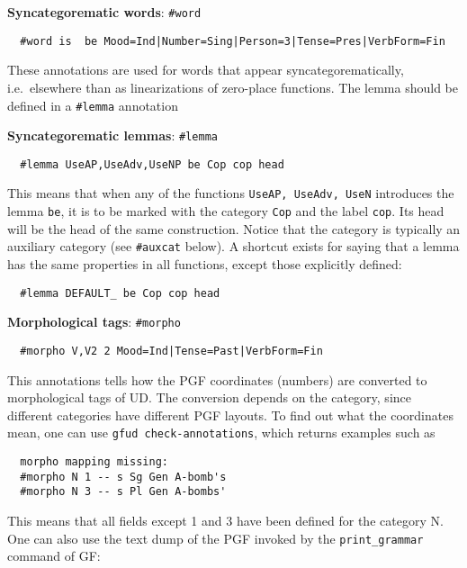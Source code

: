 \textbf{Syncategorematic words}: \texttt{\#word}

\begin{verbatim}
  #word is  be Mood=Ind|Number=Sing|Person=3|Tense=Pres|VerbForm=Fin
\end{verbatim}

These annotations are used for words that appear syncategorematically,
i.e.~elsewhere than as linearizations of zero-place functions. The lemma
should be defined in a \texttt{\#lemma} annotation

\textbf{Syncategorematic lemmas}: \texttt{\#lemma}

\begin{verbatim}
  #lemma UseAP,UseAdv,UseNP be Cop cop head
\end{verbatim}

This means that when any of the functions \texttt{UseAP,\ UseAdv,\ UseN}
introduces the lemma \texttt{be}, it is to be marked with the category
\texttt{Cop} and the label \texttt{cop}. Its head will be the head of
the same construction. Notice that the category is typically an
auxiliary category (see \texttt{\#auxcat} below). A shortcut exists for
saying that a lemma has the same properties in all functions, except
those explicitly defined:

\begin{verbatim}
  #lemma DEFAULT_ be Cop cop head
\end{verbatim}

\textbf{Morphological tags}: \texttt{\#morpho}

\begin{verbatim}
  #morpho V,V2 2 Mood=Ind|Tense=Past|VerbForm=Fin
\end{verbatim}

This annotations tells how the PGF coordinates (numbers) are converted
to morphological tags of UD. The conversion depends on the category,
since different categories have different PGF layouts. To find out what
the coordinates mean, one can use \texttt{gfud\ check-annotations},
which returns examples such as

\begin{verbatim}
  morpho mapping missing:
  #morpho N 1 -- s Sg Gen A-bomb's
  #morpho N 3 -- s Pl Gen A-bombs'
\end{verbatim}

This means that all fields except 1 and 3 have been defined for the
category N. One can also use the text dump of the PGF invoked by the
\texttt{print\_grammar} command of GF:

